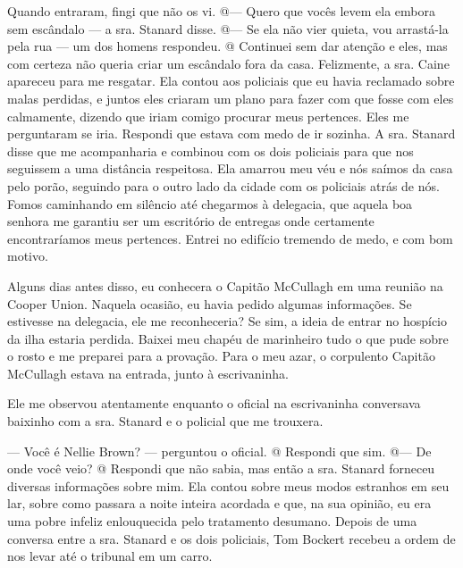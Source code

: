 Quando
entraram, fingi que não os vi. @--- Quero que vocês levem ela embora sem
escândalo --- a sra. Stanard disse. @--- Se ela não vier quieta, vou
arrastá-la pela rua --- um dos homens respondeu. @ Continuei sem dar
atenção e eles, mas com certeza não queria criar um escândalo fora da
casa. Felizmente, a sra. Caine apareceu para me resgatar. Ela contou aos
policiais que eu havia reclamado sobre malas perdidas, e juntos eles
criaram um plano para fazer com que fosse com eles calmamente, dizendo
que iriam comigo procurar meus pertences. Eles me perguntaram se iria.
Respondi que estava com medo de ir sozinha. A sra. Stanard disse que me
acompanharia e combinou com os dois policiais para que nos seguissem a
uma distância respeitosa. Ela amarrou meu véu e nós saímos da casa pelo
porão, seguindo para o outro lado da cidade com os policiais atrás de
nós. Fomos caminhando em silêncio até chegarmos à delegacia, que aquela
boa senhora me garantiu ser um escritório de entregas onde certamente
encontraríamos meus pertences. Entrei no edifício tremendo de medo, e
com bom motivo.

Alguns dias antes disso, eu conhecera o Capitão McCullagh em uma reunião
na Cooper Union. Naquela ocasião, eu havia pedido algumas informações.
Se estivesse na delegacia, ele me reconheceria? Se sim, a ideia de
entrar no hospício da ilha estaria perdida. Baixei meu chapéu de
marinheiro tudo o que pude sobre o rosto e me preparei para a provação.
Para o meu azar, o corpulento Capitão McCullagh estava na entrada, junto
à escrivaninha.

Ele me observou atentamente enquanto o oficial na escrivaninha
conversava baixinho com a sra. Stanard e o policial que me trouxera.

--- Você é Nellie Brown? --- perguntou o oficial. @ Respondi que sim.
@--- De onde você veio? @ Respondi que não sabia, mas então a sra.
Stanard forneceu diversas informações sobre mim. Ela contou sobre meus
modos estranhos em seu lar, sobre como passara a noite inteira acordada
e que, na sua opinião, eu era uma pobre infeliz enlouquecida pelo
tratamento desumano. Depois de uma conversa entre a sra. Stanard e os
dois policiais, Tom Bockert recebeu a ordem de nos levar até o tribunal
em um carro.

